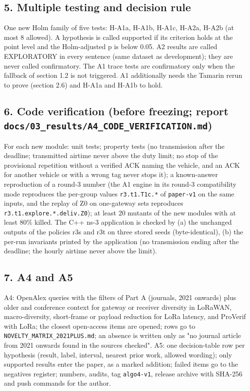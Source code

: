 \subsection*{5. Multiple testing and decision rule}

One new Holm family of five tests: H-A1a, H-A1b, H-A1c, H-A2a, H-A2b (at most 8 allowed). A hypothesis is called supported if its criterion holds at the point level and the Holm-adjusted p is below 0.05. A2 results are called EXPLORATORY in every sentence (same dataset as development); they are never called confirmatory. The A1 trace tests are confirmatory only when the fallback of section 1.2 is not triggered. A1 additionally needs the Tamarin rerun to prove (section 2.6) and H-A1a and H-A1b to hold.

\subsection*{6. Code verification (before freezing; report \texttt{docs/03\_results/A4\_CODE\_VERIFICATION.md})}

For each new module: unit tests; property tests (no transmission after the deadline; transmitted airtime never above the duty limit; no stop of the provisional repetition without a verified ACK naming the vehicle, and an ACK for another vehicle or with a wrong tag never stops it); a known-answer reproduction of a round-3 number (the A1 engine in its round-3 compatibility mode reproduces the per-group values \texttt{r3.t1.T1c.*} of \texttt{paper-v1} on the same inputs, and the replay of Z0 on one-gateway sets reproduces \texttt{r3.t1.explore.*.deliv.Z0}); at least 20 mutants of the new modules with at least 80\% killed. The C++ ns-3 application is checked by (a) the unchanged outputs of the policies r3s and r3t on three stored seeds (byte-identical), (b) the per-run invariants printed by the application (no transmission ending after the deadline; the hourly airtime never above the limit).

\subsection*{7. A4 and A5}

A4: OpenAlex queries with the filters of Part A (journals, 2021 onwards) plus older and conference context for gateway or receiver diversity in LoRaWAN, macro-diversity, short-frame or payload reduction for LoRa latency, and ProVerif with LoRa; the closest open-access items are opened; rows go to \texttt{NOVELTY\_MATRIX\_2021PLUS.md}; an absence is written only as "no journal article from 2021 onwards found in the sources checked". A5: one decision-table row per hypothesis (result, label, interval, nearest prior work, allowed wording); only supported results enter the paper, as a marked addition; failed items go to the negatives register; numbers, audits, tag \texttt{algo4-v1}, release archive with SHA-256 and push commands for the author.

